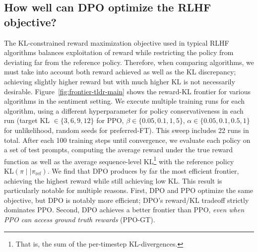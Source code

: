 \subsection{How well can DPO optimize the RLHF objective?}

The KL-constrained reward maximization objective used in typical RLHF algorithms balances exploitation of reward while restricting the policy from deviating far from the reference policy. Therefore, when comparing algorithms, we must take into account both reward achieved as well as the KL discrepancy; achieving slightly higher reward but with much higher KL is not necessarily desirable. Figure~\ref{fig:frontier-tldr-main} shows the reward-KL frontier for various algorithms in the sentiment setting. We execute multiple training runs for each algorithm, using a different hyperparameter for policy conservativeness in each run (target KL $\in\{3,6,9,12\}$ for PPO, $\beta \in \{0.05,0.1,1,5\}$, $\alpha\in\{0.05,0.1,0.5,1\}$ for unlikelihood, random seeds for preferred-FT). This sweep includes 22 runs in total. After each 100 training steps until convergence, we evaluate each policy on a set of test prompts, computing the average reward under the true reward function as well as the average sequence-level KL\footnote{That is, the sum of the per-timestep KL-divergences.} with the reference policy $\text{KL}\left(\pi\mid \mid \pi_\text{ref}\right)$. We find that DPO produces by far the most efficient frontier, achieving the highest reward while still achieving low KL. This result is particularly notable for multiple reasons. First, DPO and PPO optimize the same objective, but DPO is notably more efficient; DPO's reward/KL tradeoff strictly dominates PPO. Second, DPO achieves a better frontier than PPO, \emph{even when PPO can access ground truth rewards} (PPO-GT).

